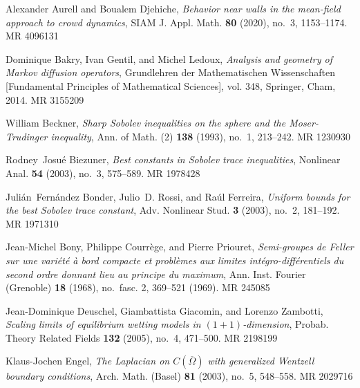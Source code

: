 \documentclass[a4paper]{article}
\theoremstyle{definition}
\numberwithin{equation}{section}
\begin{document}
\providecommand{\bysame}{\leavevmode\hbox to3em{\hrulefill}\thinspace}
\providecommand{\MR}{\relax\ifhmode\unskip\space\fi MR }
\providecommand{\MRhref}[2]{%
  \href{http://www.ams.org/mathscinet-getitem?mr=#1}{#2}
}
\providecommand{\href}[2]{#2}
\begin{thebibliography}{10}

Alexander Aurell and Boualem Djehiche, \emph{Behavior near walls in the
  mean-field approach to crowd dynamics}, SIAM J. Appl. Math. \textbf{80}
  (2020), no.~3, 1153--1174. \MR{4096131}

Dominique Bakry, Ivan Gentil, and Michel Ledoux, \emph{Analysis and geometry of
  {M}arkov diffusion operators}, Grundlehren der Mathematischen Wissenschaften
  [Fundamental Principles of Mathematical Sciences], vol. 348, Springer, Cham,
  2014. \MR{3155209}

William Beckner, \emph{Sharp {S}obolev inequalities on the sphere and the
  {M}oser-{T}rudinger inequality}, Ann. of Math. (2) \textbf{138} (1993),
  no.~1, 213--242. \MR{1230930}

Rodney~Josu\'{e} Biezuner, \emph{Best constants in {S}obolev trace
  inequalities}, Nonlinear Anal. \textbf{54} (2003), no.~3, 575--589.
  \MR{1978428}

Juli\'{a}n~Fern\'{a}ndez Bonder, Julio~D. Rossi, and Ra\'{u}l Ferreira,
  \emph{Uniform bounds for the best {S}obolev trace constant}, Adv. Nonlinear
  Stud. \textbf{3} (2003), no.~2, 181--192. \MR{1971310}

Jean-Michel Bony, Philippe Courr\`ege, and Pierre Priouret, \emph{Semi-groupes
  de {F}eller sur une vari\'{e}t\'{e} \`a bord compacte et probl\`emes aux
  limites int\'{e}gro-diff\'{e}rentiels du second ordre donnant lieu au
  principe du maximum}, Ann. Inst. Fourier (Grenoble) \textbf{18} (1968),
  no.~fasc. 2, 369--521 (1969). \MR{245085}

Jean-Dominique Deuschel, Giambattista Giacomin, and Lorenzo Zambotti,
  \emph{Scaling limits of equilibrium wetting models in {$(1+1)$}-dimension},
  Probab. Theory Related Fields \textbf{132} (2005), no.~4, 471--500.
  \MR{2198199}

Klaus-Jochen Engel, \emph{The {L}aplacian on {$C(\overline\Omega)$} with
  generalized {W}entzell boundary conditions}, Arch. Math. (Basel) \textbf{81}
  (2003), no.~5, 548--558. \MR{2029716}


\end{thebibliography}
\end{document}
